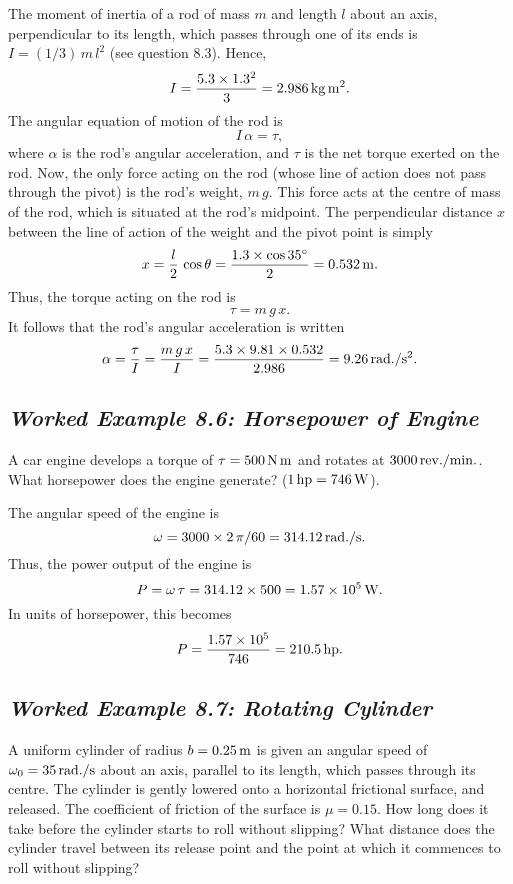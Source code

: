 \begin{figure*}[h]
\epsfysize=2.5in
\centerline{}
\end{figure*}

 The moment of inertia of a rod of mass $m$ and length $l$ about
an axis, perpendicular to its length, which passes through one of its ends is
$I= (1/3)\,m\,l^2$ (see question 8.3). Hence,
$$
I = \frac{5.3\times 1.3^2}{3} = 2.986\,{\rm kg\,m^2}.
$$
The angular equation of motion of the rod is
$$
I\,\alpha = \tau,
$$
where $\alpha$ is the rod's angular acceleration, and $\tau$ is the net torque exerted on the
rod. Now, the only force acting on the rod (whose line of action does not pass through
the pivot) is the rod's weight, $m\,g$. This force acts at the centre of mass of the rod,
which is situated at the rod's midpoint. The perpendicular distance $x$ between the 
line of action of the weight and the pivot point is simply
$$
x = \frac{l}{2}\,\cos\theta = \frac{1.3\times \cos 35^\circ}{2} = 0.532\,{\rm m}.
$$
Thus, the torque acting on the rod is 
$$
\tau = m\,g\,x.
$$
It follows that the rod's angular acceleration is written
$$
\alpha = \frac{\tau}{I} = \frac{m\,g\,x}{I} = \frac{5.3\times 9.81\times 0.532}{2.986} = 9.26\,{\rm
rad./s^2}.
$$

\subsection*{\em Worked Example 8.6: Horsepower of Engine}
 A car engine develops a torque
of $\tau=500\,{\rm N\,m}$ and rotates at $3000\,{\rm rev./min.}$.
What horsepower does the engine generate? ($1\,{\rm hp} = 746\,{\rm W}$).

 The angular speed of the engine is
$$
\omega = 3000\times 2\,\pi/ 60= 314.12\,{\rm rad./s}.
$$
Thus, the power output of the engine is
$$
P = \omega\,\tau = 314.12\times 500 = 1.57\times 10^5\,{\rm W}.
$$
In units of horsepower, this becomes
$$
P = \frac{1.57\times 10^5}{746} = 210.5\,{\rm hp}.
$$

\subsection*{\em  Worked Example 8.7: Rotating Cylinder}
 A uniform cylinder of radius $b=0.25\,{\rm m}$ is given
an angular speed of $\omega_0=35\,{\rm rad./s}$ about an axis, parallel
to its length, which passes through its centre. The cylinder is gently lowered onto
a horizontal frictional surface, and released. The coefficient of friction
of the surface is $\mu=0.15$. How long does it take before the 
cylinder starts to roll without slipping? What distance does the cylinder
travel between its release point and the point at which it commences to
roll without slipping?

